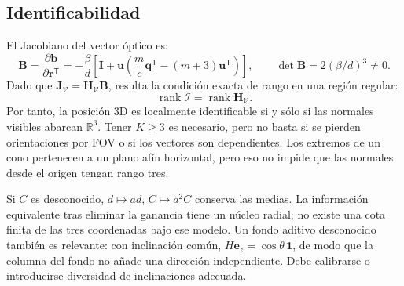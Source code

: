 \documentclass[11pt,a4paper]{article}
\begin{document}
\subsection{Identificabilidad}
El Jacobiano del vector óptico es:
\begin{equation}
\mathbf B=\frac{\partial\mathbf b}{\partial\mathbf r^{\mathsf T}}
=-\frac{\beta}{d}\left[\mathbf I+\mathbf u\left(\frac{m}{c}\mathbf q^{\mathsf T}-(m+3)\mathbf u^{\mathsf T}\right)\right],
\qquad \det\mathbf B=2(\beta/d)^3\ne0.
\end{equation}
Dado que $\mathbf J_{\mathcal V}=\mathbf H_{\mathcal V}\mathbf B$, resulta la condición exacta de rango en una región regular:
\begin{equation}
\operatorname{rank}\mathcal I=\operatorname{rank}\mathbf H_{\mathcal V}.
\end{equation}
Por tanto, la posición 3D es localmente identificable si y sólo si las normales visibles abarcan $\mathbb R^3$. Tener $K\geq3$ es necesario, pero no basta si se pierden orientaciones por FOV o si los vectores son dependientes. Los extremos de un cono pertenecen a un plano afín horizontal, pero eso no impide que las normales desde el origen tengan rango tres.

Si $C$ es desconocido, $d\mapsto ad$, $C\mapsto a^2C$ conserva las medias. La información equivalente tras eliminar la ganancia tiene un núcleo radial; no existe una cota finita de las tres coordenadas bajo ese modelo. Un fondo aditivo desconocido también es relevante: con inclinación común, $H\mathbf e_z=\cos\theta\,\mathbf1$, de modo que la columna del fondo no añade una dirección independiente. Debe calibrarse o introducirse diversidad de inclinaciones adecuada.
\end{document}
